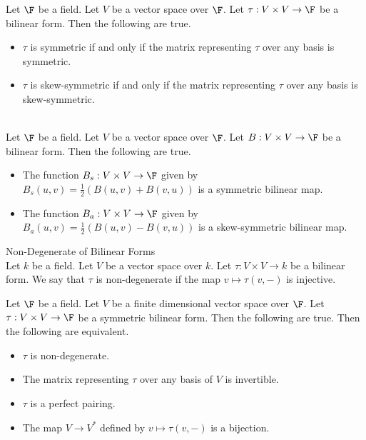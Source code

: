 \documentclass[a4paper]{article}
\begin{document}
\begin{prp}{}{} Let $\F$ be a field. Let $V$ be a vector space over $\F$. Let $\tau:V\times V\to\F$ be a bilinear form. Then the following are true. 
\begin{itemize}
\item $\tau$ is symmetric if and only if the matrix representing $\tau$ over any basis is symmetric. 
\item $\tau$ is skew-symmetric if and only if the matrix representing $\tau$ over any basis is skew-symmetric. 
\end{itemize}
\end{prp}

\begin{prp}{}{}\\
Let $\F$ be a field. Let $V$ be a vector space over $\F$. Let $B:V\times V\to\F$ be a bilinear form. Then the following are true. 
\begin{itemize}
\item The function $B_s:V\times V\to\F$ given by $B_s(u,v)=\frac{1}{2}\left(B(u,v)+B(v,u)\right)$ is a symmetric bilinear map. 
\item The function $B_a:V\times V\to\F$ given by $B_a(u,v)=\frac{1}{2}\left(B(u,v)-B(v,u)\right)$ is a skew-symmetric bilinear map. 
\end{itemize}
\end{prp}

\begin{defn}{Non-Degenerate of Bilinear Forms}{}\\
Let $k$ be a field. Let $V$ be a vector space over $k$. Let $\tau:V\times V\to k$ be a bilinear form. We say that $\tau$ is non-degenerate if the map $v\mapsto\tau(v,-)$ is injective. 
\end{defn}

\begin{prp}{}{} Let $\F$ be a field. Let $V$ be a finite dimensional vector space over $\F$. Let $\tau:V\times V\to\F$ be a symmetric bilinear form. Then the following are true. Then the following are equivalent. 
\begin{itemize}
\item $\tau$ is non-degenerate. 
\item The matrix representing $\tau$ over any basis of $V$ is invertible. 
\item $\tau$ is a perfect pairing. 
\item The map $V\to V^\ast$ defined by $v\mapsto\tau(v,-)$ is a bijection. 
\end{itemize}
\end{prp}
\end{document}
